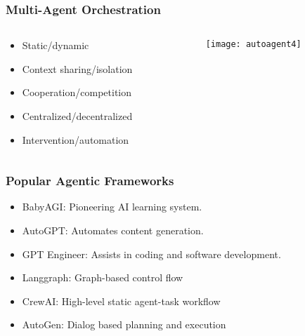 \begin{frame}[fragile]\frametitle{Multi-Agent Orchestration}


\begin{columns}
    \begin{column}[T]{0.6\linewidth}

		  \begin{itemize}
		  \item Static/dynamic
		  \item Context sharing/isolation
		  \item Cooperation/competition
		  \item Centralized/decentralized
		  \item Intervention/automation
		  \end{itemize}

    \end{column}
    \begin{column}[T]{0.4\linewidth}

		\begin{center}
		\texttt{[image: autoagent4]}
		\end{center}
	
    \end{column}
  \end{columns}
  
  

\end{frame}

\begin{frame}[fragile]\frametitle{Popular Agentic Frameworks}

  \begin{itemize}
    \item BabyAGI: Pioneering AI learning system.
    \item AutoGPT: Automates content generation.
    \item GPT Engineer: Assists in coding and software development.
	\item Langgraph: Graph-based control flow
	\item CrewAI: High-level static agent-task workflow
    \item AutoGen: Dialog based planning and execution
  \end{itemize}
\end{frame}

